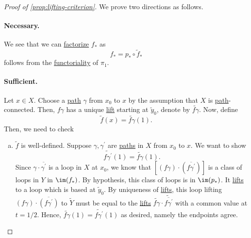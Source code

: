 \begin{proof}[Proof of \autoref{prop:lifting-criterion}]\let\qed\relax
	We prove two directions as follows.

	\paragraph{Necessary.} We see that we can \hyperref[def:factorization]{factorize} \(f_\ast\) as
	\[
		f_\ast = p_\ast \circ \widetilde{f} _\ast
	\]
	follows from the \hyperref[def:functor]{functoriality} of \(\pi _1\).

	\paragraph{Sufficient.} Let \(x\in X\). Choose a \hyperref[def:path]{path} \(\gamma\) from \(x_0\) to \(x\) by the assumption that \(X\) is \hyperref[def:path]{path}-connected. Then, \(f \gamma \) has a unique \hyperref[def:lift]{lift} starting at \(\widetilde{y} _0\), denote by \(\widetilde{f\gamma}\). Now, define
	\[
		\widetilde{f} (x) = \widetilde{f \gamma } (1).
	\]
	Then, we need to check
	\begin{enumerate}[(a)]
		\item \(\widetilde{f} \) is well-defined. Suppose \(\gamma , \gamma ^\prime \) are \hyperref[def:path]{paths} in \(X\) from \(x_0\) to \(x\). We want to show
		      \[
			      \widetilde{f \gamma^\prime} (1) = \widetilde{f \gamma } (1).
		      \]
		      Since \(\gamma \cdot \overline{\gamma^\prime}\) is a loop in \(X\) at \(x_{0}\), we know that \([(f \gamma)\cdot (\overline{f \gamma ^\prime}) ]\) is a class of loops in \(Y\) in \(\im  (f_\ast)\). By hypothesis, this class of loops is in \(\im  (p_*)\). It \hyperref[prop:homotopy-lifting-property]{lifts} to a loop which is based at \(\widetilde{y} _0\). By uniqueness of \hyperref[prop:homotopy-lifting-property]{lifts}, this loop lifting \((f \gamma )\cdot \overline{(f \gamma ^\prime )}\) to \(\widetilde{Y} \) must be equal to the \hyperref[prop:homotopy-lifting-property]{lifts} \(\widetilde{f \gamma }\cdot \widetilde{\overline{f \gamma ^\prime }}  \) with a common value at \(t = 1 / 2\). Hence, \(\widetilde{f \gamma }(1) = \widetilde{f \gamma ^\prime }(1)\) as desired, namely the endpoints agree.
		      \begin{figure}[H]
			      \centering
			      \label{fig:pf:prop:lifting-criterion}
		      \end{figure}
	\end{enumerate}
\end{proof}